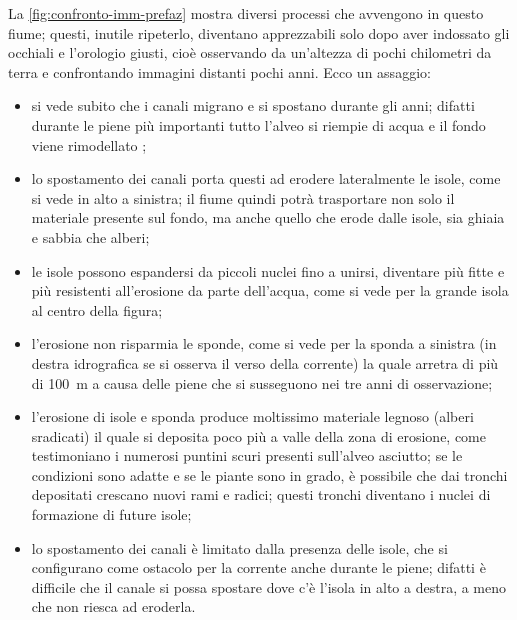 \medskip
La \vref{fig:confronto-imm-prefaz} mostra diversi processi che avvengono in questo fiume; questi, inutile ripeterlo, diventano apprezzabili solo dopo aver indossato gli occhiali e l'orologio giusti, cioè osservando da un'altezza di pochi chilometri da terra e confrontando immagini distanti pochi anni. Ecco un assaggio:
\begin{itemize}
	\item si vede subito che i canali migrano e si spostano durante gli anni; 
		difatti durante le piene più importanti tutto l'alveo si riempie di acqua e il fondo viene rimodellato ;
	\item lo spostamento dei canali porta questi ad erodere lateralmente le isole, come si vede in alto a sinistra; 
		il fiume quindi potrà trasportare non solo il materiale presente sul fondo, ma anche quello che erode dalle isole, sia ghiaia e sabbia che alberi;
	\item le isole possono espandersi da piccoli nuclei fino a unirsi, diventare più fitte e più resistenti all'erosione da parte dell'acqua, come si vede per la grande isola al centro della figura;
	\item l'erosione non risparmia le sponde, come si vede per la sponda a sinistra (in destra idrografica se si osserva il verso della corrente) la quale arretra di più di \SI{100}{\m} a causa delle piene che si susseguono nei tre anni di osservazione;
	\item l'erosione di isole e sponda produce moltissimo materiale legnoso (alberi sradicati) il quale si deposita poco più a valle della zona di erosione, come testimoniano i numerosi puntini scuri presenti sull'alveo asciutto; 
		se le condizioni sono adatte e se le piante sono in grado, è possibile che dai tronchi depositati crescano nuovi rami e radici; 
		questi tronchi diventano i nuclei di formazione di future isole;
	\item lo spostamento dei canali è limitato dalla presenza delle isole, che si configurano come ostacolo per la corrente anche durante le piene;
		difatti è difficile che il canale si possa spostare dove c'è l'isola in alto a destra, a meno che non riesca ad eroderla.
\end{itemize}

